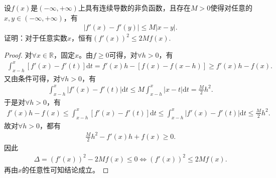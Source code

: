 \documentclass[../../main.tex]{subfiles}%
\begin{document}
\begin{example}
设$f(x)$是$(-\infty,+\infty)$上具有连续导数的非负函数，且存在$M > 0$使得对任意的$x,y \in (-\infty,+\infty)$，有
\begin{align*}
|f'(x) - f'(y)| \leqslant M|x - y|.
\end{align*}
证明：对于任意实数$x$，恒有$(f'(x))^2 \leqslant 2Mf(x)$.
\end{example}
\begin{proof}
对$\forall x \in \mathbb{R}$，固定$x$。由$f \geqslant 0$可得，对$\forall h > 0$，有
\begin{align*}
\int_{x-h}^x [f'(x) - f'(t)] \mathrm{d}t = f'(x)h - [f(x) - f(x - h)] \geqslant f'(x)h - f(x).
\end{align*}
又由条件可得，对$\forall h > 0$，有
\begin{align*}
\int_{x-h}^x |f'(x) - f'(t)| \mathrm{d}t \leqslant M \int_{x-h}^x |x - t| \mathrm{d}t = \frac{M}{2}h^2.
\end{align*}
于是对$\forall h > 0$，有
\begin{align*}
f'(x)h - f(x) \leqslant \int_{x-h}^x [f'(x) - f'(t)] \mathrm{d}t \leqslant \int_{x-h}^x |f'(x) - f'(t)| \mathrm{d}t \leqslant \frac{M}{2}h^2.
\end{align*}
故对$\forall h > 0$，都有
\begin{align*}
\frac{M}{2}h^2 - f'(x)h + f(x) \geqslant 0.
\end{align*}
因此
\begin{align*}
\Delta = (f'(x))^2 - 2Mf(x) \leqslant 0 \Longleftrightarrow (f'(x))^2 \leqslant 2Mf(x).
\end{align*}
再由$x$的任意性可知结论成立。
\end{proof}
\end{document}
